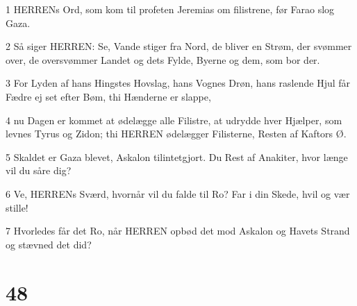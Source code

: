 \par 1 HERRENs Ord, som kom til profeten Jeremias om filistrene, før Farao slog Gaza.
\par 2 Så siger HERREN: Se, Vande stiger fra Nord, de bliver en Strøm, der svømmer over, de oversvømmer Landet og dets Fylde, Byerne og dem, som bor der.
\par 3 For Lyden af hans Hingstes Hovslag, hans Vognes Drøn, hans raslende Hjul får Fædre ej set efter Bøm, thi Hænderne er slappe,
\par 4 nu Dagen er kommet at ødelægge alle Filistre, at udrydde hver Hjælper, som levnes Tyrus og Zidon; thi HERREN ødelægger Filisterne, Resten af Kaftors Ø.
\par 5 Skaldet er Gaza blevet, Askalon tilintetgjort. Du Rest af Anakiter, hvor længe vil du såre dig?
\par 6 Ve, HERRENs Sværd, hvornår vil du falde til Ro? Far i din Skede, hvil og vær stille!
\par 7 Hvorledes får det Ro, når HERREN opbød det mod Askalon og Havets Strand og stævned det did?

\chapter{48}


